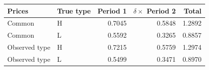 \begin{tabular}{llrrr}\toprule
Prices & True type & Period 1 & $\delta\times$ Period 2 & Total\\\midrule
Common & H & 0.7045 & 0.5848 & 1.2892\\
Common & L & 0.5592 & 0.3265 & 0.8857\\
Observed type & H & 0.7215 & 0.5759 & 1.2974\\
Observed type & L & 0.5499 & 0.3471 & 0.8970\\
\bottomrule\end{tabular}
